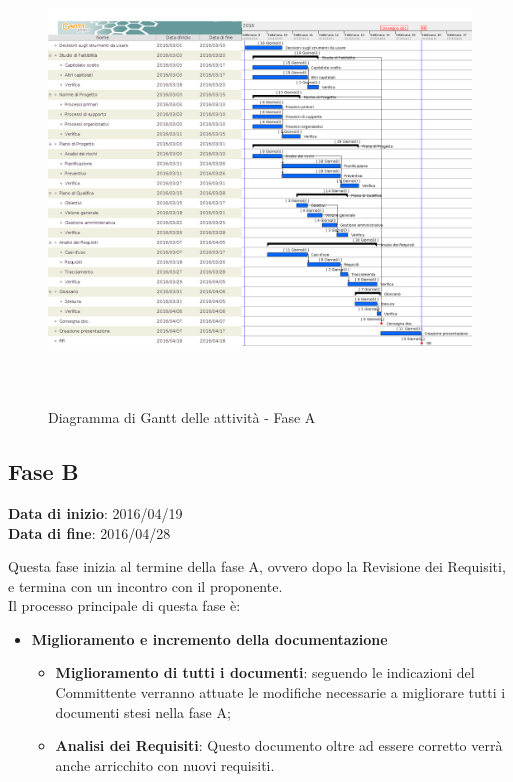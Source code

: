		\begin{figure}[!h]
			\centering
			\includegraphics[height=12cm, width=15cm]{img/gantt/A} 
			\caption{Diagramma di Gantt delle attività - Fase A}
		\end{figure}
		
	\subsection{Fase B}
	\begin{center}
		\textbf{Data di inizio}: 2016/04/19 \\
		\textbf{Data di fine}: 2016/04/28 \\
	\end{center}
	Questa fase inizia al termine della fase A, ovvero dopo la Revisione dei Requisiti, e termina con un incontro con il proponente. \\ 
	Il processo principale di questa fase è:
	\begin{itemize}
		\item \textbf{Miglioramento e incremento della documentazione}
		\att
		\begin{itemize}
			\item \textbf{Miglioramento di tutti i documenti}: seguendo le indicazioni del Committente verranno attuate le modifiche necessarie a migliorare tutti i documenti stesi nella fase A;
			\item \textbf{Analisi dei Requisiti}: Questo documento oltre ad essere corretto verrà anche arricchito con nuovi requisiti.
		\end{itemize}
	\end{itemize}
		
